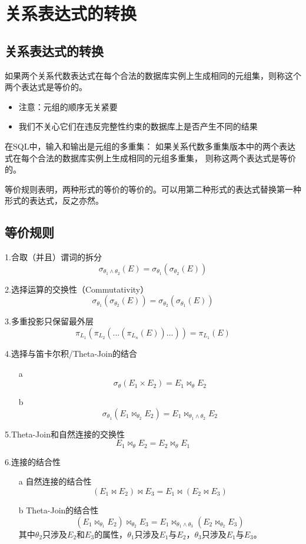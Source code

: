 \section{关系表达式的转换}

\subsection{关系表达式的转换}

如果两个关系代数表达式在每个合法的数据库实例上生成相同的元组集，则称这个两个表达式是等价的。
\begin{itemize}
    \item 注意：元组的顺序无关紧要
    \item 我们不关心它们在违反完整性约束的数据库上是否产生不同的结果
\end{itemize}

在SQL中，输入和输出是元组的多重集：
如果关系代数多重集版本中的两个表达式在每个合法的数据库实例上生成相同的元组多重集，
则称这两个表达式是等价的。

等价规则表明，两种形式的等价的等价的。可以用第二种形式的表达式替换第一种形式的表达式，反之亦然。

\subsection{等价规则}

\noindent 1.合取（并且）谓词的拆分
$$\sigma_{\theta_1 \land \theta_2}(E)=\sigma_{\theta_1}(\sigma_{\theta_2}(E))$$

\noindent 2.选择运算的交换性（Commutativity）
$$\sigma_{\theta_1}(\sigma_{\theta_2}(E))=\sigma_{\theta_2}(\sigma_{\theta_1}(E))$$

\noindent 3.多重投影只保留最外层
$$\pi_{L_1}(\pi_{L_2}(...(\pi_{L_n}(E))...))=\pi_{L_1}(E)$$

\noindent 4.选择与笛卡尔积/Theta-Join的结合

\begin{itemize}
    \item[a] $$\sigma_{\theta}(E_1\times E_2)=E_1 \Join_{\theta}E_2$$
    \item[b] $$\sigma_{\theta_1}(E_1\Join_{\theta_2} E_2)=E_1 \Join_{\theta_1 \land \theta_2}E_2$$
\end{itemize}

\noindent 5.Theta-Join和自然连接的交换性
$$E_1\Join_{\theta}E_2=E_2\Join_{\theta}E_1$$

\noindent 6.连接的结合性
\begin{itemize}
    \item[a] 自然连接的结合性 $$(E_1\Join E_2)\Join E_3=E_1\Join(E_2\Join E_3)$$
    \item[b] Theta-Join的结合性 $$(E_1\Join_{\theta_1}E_2)\Join_{\theta_2}E_3=E_1\Join_{\theta_1\land \theta_3}(E_2\Join_{\theta_2}E_3)$$ 其中$\theta_2$只涉及$E_2$和$E_3$的属性，$\theta_1$只涉及$E_1$与$E_2$，$\theta_3$只涉及$E_1$与$E_3$。
\end{itemize}

